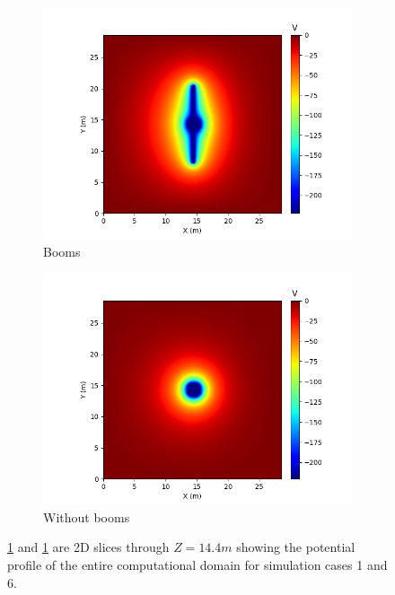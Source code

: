 \begin{center}
\begin{figure}[H]
  \begin{subfigure}[b]{0.61\textwidth}
    \includegraphics[width=\textwidth]{figures/MMO/noPH/WB/P_noPH_WB.png}
    \caption{Booms}
    \label{fig:P_noPH_WB}
  \end{subfigure}
  \hfill
  \begin{subfigure}[b]{0.61\textwidth}
    \includegraphics[width=\textwidth]{figures/MMO/noPH/NB/P_noPH_NB.png}
    \caption{Without booms}
    \label{fig:P_noPH_NB}
  \end{subfigure}
  \caption{\ref{fig:P_noPH_WB} and \ref{fig:P_noPH_WB} are 2D slices through $Z = 14.4 m$ showing the potential profile of the entire computational domain for simulation cases 1 and 6.}
  \label{fig:PMMOnoPH}
\end{figure}
\end{center}

